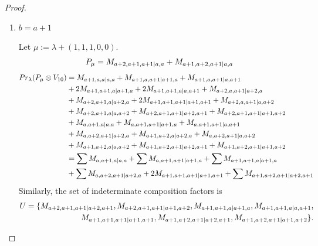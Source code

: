 \begin{proof}
\begin{enumerate}
\begin{enumerate}
        \item $b=a+1$ \par
        Let $\mu:=\lambda + (1,1,1,0,0) $.
        \begin{equation}\notag
          \begin{aligned}
            P_\mu = M_{a+2,a+1,a+1|a,a}
+ M_{a+1,a+2,a+1|a,a}
          \end{aligned}
        \end{equation}
        \begin{equation}\notag
          \begin{aligned}
            Pr_{\lambda}(P_\mu \otimes V_{10}) &=
M_{a+1,a,a|a,a}
+ M_{a+1,a,a+1|a+1,a}
+ M_{a+1,a,a+1|a,a+1}\\
                                              &
+ 2M_{a+1,a+1,a|a+1,a}
+ 2M_{a+1,a+1,a|a,a+1}
+ M_{a+2,a,a+1|a+2,a}\\
                                              &
+ M_{a+2,a+1,a|a+2,a}
+ 2M_{a+1,a+1,a+1|a+1,a+1}
+ M_{a+2,a,a+1|a,a+2}\\
                                              &
+ M_{a+2,a+1,a|a,a+2}
+ M_{a+2,a+1,a+1|a+2,a+1}
+ M_{a+2,a+1,a+1|a+1,a+2}\\
                                              &
+ M_{a,a+1,a|a,a}
+ M_{a,a+1,a+1|a+1,a}
+ M_{a,a+1,a+1|a,a+1}\\
                                              &
+ M_{a,a+2,a+1|a+2,a}
+ M_{a+1,a+2,a|a+2,a}
+ M_{a,a+2,a+1|a,a+2}\\
                                              &
+ M_{a+1,a+2,a|a,a+2}
+ M_{a+1,a+2,a+1|a+2,a+1}
+ M_{a+1,a+2,a+1|a+1,a+2} \\
                                               &=
\sum M_{a,a+1,a|a,a}
+ \sum M_{a,a+1,a+1|a+1,a}
+ \sum M_{a+1,a+1,a|a+1,a}\\
                                              &
+ \sum M_{a,a+2,a+1|a+2,a}
+ 2 M_{a+1,a+1,a+1|a+1,a+1}
+ \sum M_{a+1,a+2,a+1|a+2,a+1}
          \end{aligned}
        \end{equation}
      Similarly, the set of indeterminate composition factors is 
\begin{equation}\notag
  \begin{aligned}
    U = \{
M_{a+2,a+1,a+1|a+2,a+1},
M_{a+2,a+1,a+1|a+1,a+2},
M_{a+1,a+1,a|a+1,a},
M_{a+1,a+1,a|a,a+1},\\
M_{a+1,a+1,a+1|a+1,a+1},
M_{a+1,a+2,a+1|a+2,a+1},
M_{a+1,a+2,a+1|a+1,a+2}
\}.
  \end{aligned}

\end{equation}
\end{enumerate}
\end{enumerate}
\end{proof}
